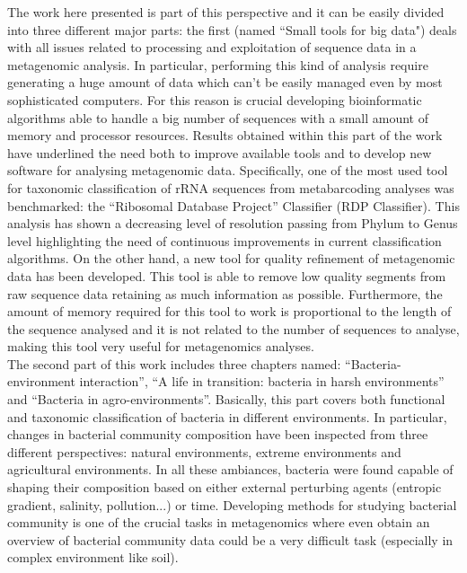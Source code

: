 The work here presented is part of this perspective and it can be easily divided into three different major parts: the first (named ``Small tools for big data") deals with all issues related to processing and exploitation of sequence data in a metagenomic analysis. In particular, performing this kind of analysis require generating a huge amount of data which can't be easily managed even by most sophisticated computers. For this reason is crucial developing bioinformatic algorithms able to handle a big number of sequences with a small amount of memory and processor resources. Results obtained within this part of the work have underlined the need both to improve available tools and to develop new software for analysing metagenomic data. Specifically, one of the most used tool for taxonomic classification of rRNA sequences from metabarcoding analyses was benchmarked: the ``Ribosomal Database Project'' Classifier (RDP Classifier). This analysis has shown a decreasing level of resolution passing from Phylum to Genus level highlighting the need of continuous improvements in current classification algorithms. On the other hand, a new tool for quality refinement of metagenomic data has been developed. This tool is able to remove low quality segments from raw sequence data retaining as much information as possible. Furthermore, the amount of memory required for this tool to work is proportional to the length of the sequence analysed and it is not related to the number of sequences to analyse, making this tool very useful for metagenomics analyses.\\
The second part of this work includes three chapters named: ``Bacteria-environment interaction'', ``A life in transition: bacteria in harsh environments'' and ``Bacteria in agro-environments''. Basically, this part covers both functional and taxonomic classification of bacteria in different environments. In particular, changes in bacterial community composition have been inspected from three different perspectives: natural environments, extreme environments and agricultural environments. In all these ambiances, bacteria were found capable of shaping their composition based on either external perturbing agents (entropic gradient, salinity, pollution...) or time. Developing methods for studying bacterial community is one of the crucial tasks in metagenomics where even obtain an overview of bacterial community data could be a very difficult task (especially in complex environment like soil).\\

